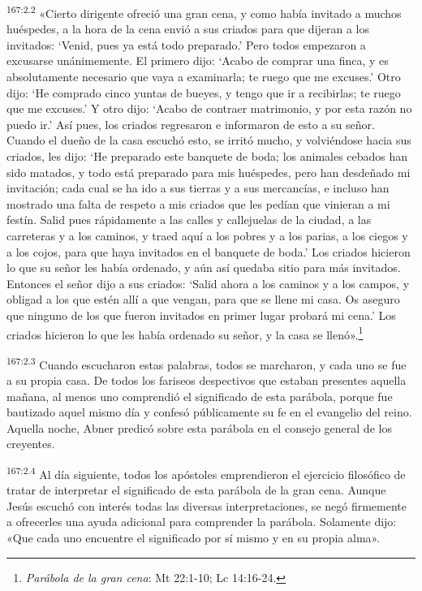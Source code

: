 \par 
\textsuperscript{167:2.2} «Cierto dirigente ofreció una gran cena, y como había invitado a muchos huéspedes, a la hora de la cena envió a sus criados para que dijeran a los invitados:
`Venid, pues ya está todo preparado.' Pero todos empezaron a excusarse unánimemente. El primero dijo: `Acabo de comprar una finca, y es absolutamente necesario que vaya a examinarla; te ruego que me excuses.' Otro dijo: `He comprado cinco yuntas de bueyes, y tengo que ir a recibirlas; te ruego que me excuses.' Y otro dijo: `Acabo de contraer matrimonio, y por esta razón no puedo ir.' Así pues, los criados regresaron e informaron de esto a su señor. Cuando el dueño de la casa escuchó esto, se irritó mucho, y volviéndose hacia sus criados, les dijo: `He preparado este banquete de boda; los animales cebados han sido matados, y todo está preparado para mis huéspedes, pero han desdeñado mi invitación; cada cual se ha ido a sus tierras y a sus mercancías, e incluso han mostrado una falta de respeto a mis criados que les pedían que vinieran a mi festín. Salid pues rápidamente a las calles y callejuelas de la ciudad, a las carreteras y a los caminos, y traed aquí a los pobres y a los parias, a los ciegos y a los cojos, para que haya invitados en el banquete de boda.' Los criados hicieron lo que su señor les había ordenado, y aún así quedaba sitio para más invitados. Entonces el señor dijo a sus criados: `Salid ahora a los caminos y a los campos, y obligad a los que estén allí a que vengan, para que se llene mi casa. Os aseguro que ninguno de los que fueron invitados en primer lugar probará mi cena.' Los criados hicieron lo que les había ordenado su señor, y la casa se llenó».\footnote{\textit{Parábola de la gran cena}: Mt 22:1-10; Lc 14:16-24.}

\par 
\textsuperscript{167:2.3} Cuando escucharon estas palabras, todos se marcharon, y cada uno se fue a su propia casa. De todos los fariseos despectivos que estaban presentes aquella mañana, al menos uno comprendió el significado de esta parábola, porque fue bautizado aquel mismo día y confesó públicamente su fe en el evangelio del reino. Aquella noche, Abner predicó sobre esta parábola en el consejo general de los creyentes.

\par 
\textsuperscript{167:2.4} Al día siguiente, todos los apóstoles emprendieron el ejercicio filosófico de tratar de interpretar el significado de esta parábola de la gran cena. Aunque Jesús escuchó con interés todas las diversas interpretaciones, se negó firmemente a ofrecerles una ayuda adicional para comprender la parábola. Solamente dijo: «Que cada uno encuentre el significado por sí mismo y en su propia alma».

